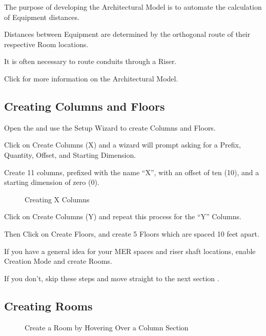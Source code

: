 \documentclass[letterpaper,10pt,english]{sphinxmanual}
\begin{document}
The purpose of developing the Architectural Model is to automate the calculation of Equipment distances.

Distances between Equipment are determined by the orthogonal route of their respective Room locations.

It is often necessary to route conduits through a Riser.

Click {\hyperref[\detokenize{docs/userguide/index-user_guide:architectural-workspaces}]{}} for more information on the Architectural Model.


\subsection{Creating Columns and Floors}
\label{\detokenize{docs/tutorial/index-tutorial:creating-columns-and-floors}}
Open the {\hyperref[\detokenize{docs/userguide/definingarchitecturalelements/floorplans/index-floor-plans:floor-plans}]{}} and use the Setup Wizard to create Columns and Floors.

Click on Create Columns (X) and a wizard will prompt asking for a Prefix, Quantity, Offset, and Starting Dimension.

Create 11 columns, prefixed with the name “X”, with an offset of ten (10), and a starting dimension of zero (0).

\begin{figure}[H]
\centering
\capstart

\noindent{}
\caption{Creating X Columns}\label{\detokenize{docs/tutorial/index-tutorial:id5}}\end{figure}

Click on Create Columns (Y) and repeat this process for the “Y” Columns.

Then Click on Create Floors, and create 5 Floors which are spaced 10 feet apart.

If you have a general idea for your MER spaces and riser shaft locations, enable Creation Mode and create Rooms.

If you don’t, skip these steps and move straight to the next section {\hyperref[\detokenize{docs/tutorial/index-tutorial:modeling-electrical-system}]{}}.


\subsection{Creating Rooms}
\label{\detokenize{docs/tutorial/index-tutorial:creating-rooms}}
\begin{figure}[H]
\centering
\capstart

\noindent{}
\caption{Create a Room by Hovering Over a Column Section}\label{\detokenize{docs/tutorial/index-tutorial:id6}}\end{figure}
\end{document}
